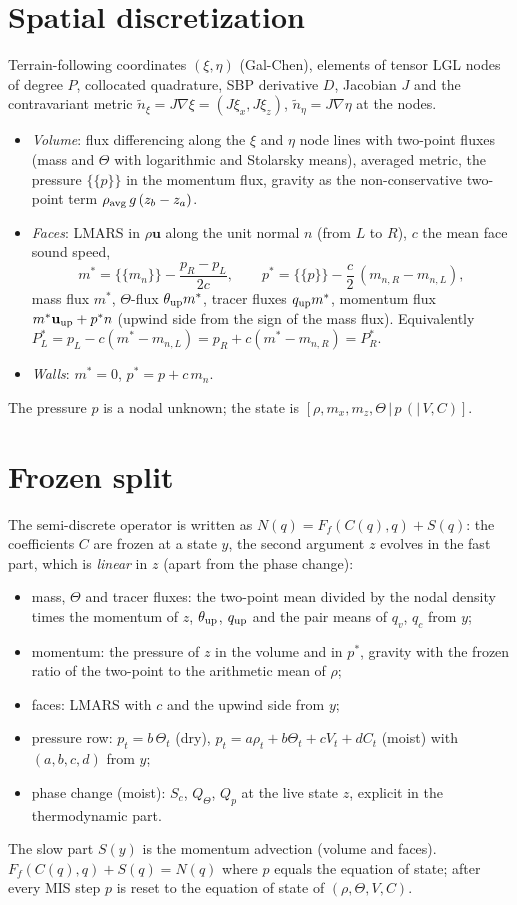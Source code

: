 \documentclass[11pt,a4paper]{article}
\newcommand{\avg}[1]{\{\!\{#1\}\!\}}
\begin{document}
\section{Spatial discretization}
Terrain-following coordinates $(\xi,\eta)$ (Gal-Chen), elements of tensor LGL nodes of degree $P$, collocated quadrature, SBP
derivative $D$, Jacobian $J$ and the contravariant metric $\tilde n_\xi=J\nabla\xi=(J\xi_x,J\xi_z)$, $\tilde n_\eta=J\nabla\eta$ at the nodes.
\begin{itemize}
\item \emph{Volume}: flux differencing along the $\xi$ and $\eta$ node lines with two-point fluxes (mass and $\Theta$ with logarithmic
  and Stolarsky means), averaged metric, the pressure $\avg p$ in the momentum flux, gravity as the non-conservative two-point term
  $\rho_{\rm avg}\,g\,(z_b-z_a)$.
\item \emph{Faces}: LMARS in $\rho\mathbf u$ along the unit normal $n$ (from $L$ to $R$), $c$ the mean face sound speed,
  \[
  m^*=\avg{m_n}-\frac{p_R-p_L}{2c},\qquad p^*=\avg p-\frac c2\,(m_{n,R}-m_{n,L}),
  \]
  mass flux $m^*$, $\Theta$-flux $\theta_{\rm up}m^*$, tracer fluxes $q_{\rm up}m^*$, momentum flux $m^*\mathbf u_{\rm up}+p^*n$ (upwind side
  from the sign of the mass flux). Equivalently $P^*_L=p_L-c(m^*-m_{n,L})=p_R+c(m^*-m_{n,R})=P^*_R$.
\item \emph{Walls}: $m^*=0$, $p^*=p+c\,m_n$.
\end{itemize}
The pressure $p$ is a nodal unknown; the state is $[\rho,m_x,m_z,\Theta\,|\,p\,(|\,V,C)]$.

\section{Frozen split}
The semi-discrete operator is written as $N(q)=F_f(C(q),q)+S(q)$: the coefficients $C$ are frozen at a state $y$, the second argument
$z$ evolves in the fast part, which is \emph{linear} in $z$ (apart from the phase change):
\begin{itemize}
\item mass, $\Theta$ and tracer fluxes: the two-point mean divided by the nodal density times the momentum of $z$, $\theta_{\rm up}$, $q_{\rm up}$
  and the pair means of $q_v$, $q_c$ from $y$;
\item momentum: the pressure of $z$ in the volume and in $p^*$, gravity with the frozen ratio of the two-point to the arithmetic mean of $\rho$;
\item faces: LMARS with $c$ and the upwind side from $y$;
\item pressure row: $p_t=b\,\Theta_t$ (dry), $p_t=a\rho_t+b\Theta_t+cV_t+dC_t$ (moist) with $(a,b,c,d)$ from $y$;
\item phase change (moist): $S_c$, $Q_\Theta$, $Q_p$ at the live state $z$, explicit in the thermodynamic part.
\end{itemize}
The slow part $S(y)$ is the momentum advection (volume and faces). $F_f(C(q),q)+S(q)=N(q)$ where $p$ equals the equation of state;
after every MIS step $p$ is reset to the equation of state of $(\rho,\Theta,V,C)$.
\end{document}
